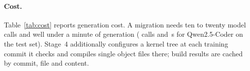 \begin{table}[t]
\centering
\caption{Cost per migration of the \textsc{full} configuration on one laptop GPU (RTX~5060, 8\,GB): model calls
and seconds of generation in stage~2, and repair calls of the compile critic (stage~4), mean over migrations and
seeds. Compilation time is excluded.}
\label{tab:cost}
\resizebox{\columnwidth}{!}{}
\end{table}

\paragraph{Cost.} Table~\ref{tab:cost} reports generation cost. A migration needs ten to twenty model calls and well
under a minute of generation (\testCostQwenCoderCalls{} calls and \testCostQwenCoderSeconds{}\,s for
Qwen2.5-Coder on the test set). Stage~4 additionally configures a kernel tree at each training commit it checks
and compiles single object files there; build results are cached by commit, file and content.
